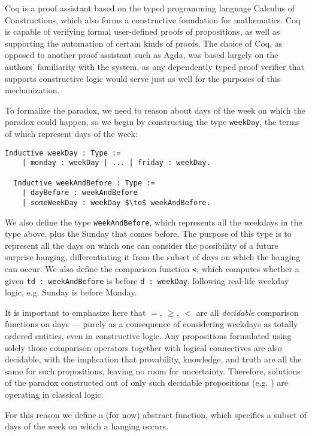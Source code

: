 \documentclass[runningheads]{llncs}
\begin{document}
Coq is a proof assistant based on the typed programming language Calculus of Constructions, which also forms a constructive foundation for mathematics.
Coq is capable of verifying formal user-defined proofs of propositions, as well as supporting
the automation of certain kinds of proofs. The choice of Coq, as opposed to another
proof assistant such as Agda, was based largely on the authors' familiarity with the system,
as any dependently typed proof verifier that supports constructive logic
would serve just as well for the purposes of this mechanization.

To formalize the paradox, we need to reason about days of the week on which
the paradox could happen, so we
begin by constructing the type {\tt weekDay}, the terms of which represent
days of the week:

\begin{lstlisting}[mathescape=true]
  Inductive weekDay : Type :=
    | monday : weekDay | ... | friday : weekDay.

  Inductive weekAndBefore : Type :=
    | dayBefore : weekAndBefore
    | someWeekDay : weekDay $\to$ weekAndBefore.
\end{lstlisting}

We also define the type {\tt weekAndBefore}, which represents all the weekdays in
the type above, plus the Sunday that comes before. The purpose of this type is to
represent all the days on which one can consider the possibility of a future
surprise hanging,
differentiating it from the subset of days on which the hanging can occur. We
also define the comparison function {\tt <}, which computes
whether a given {\tt td : weekAndBefore} is before {\tt d : weekDay},
following real-life weekday logic, e.g. Sunday is before Monday.

It is important to emphasize here that $=,~\geq,~<$ are all \emph{decidable}
comparison functions on days --- purely as a consequence of considering weekdays
as totally ordered entities, even in constructive logic. Any propositions
formulated using solely those comparison operators together with logical connectives are also decidable,
with the implication that provability, knowledge, and truth are all the same for such propositions,
leaving no room for uncertainty.
Therefore, solutions of the paradox constructed out of only such decidable propositions (e.g. \cite{godelinconsistent})
are operating in classical logic.

For this reason we define a (for now) abstract function, which specifies a subset of
days of the week on which a hanging occurs.
\end{document}

